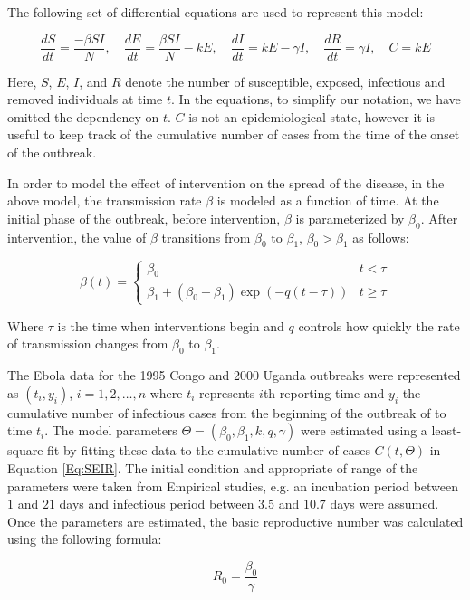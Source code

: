 \documentclass[10pt, journal,onecolumn]{IEEEtran}
\begin{document}
The following set of differential equations are used to represent this model:

$$
\dfrac{dS}{dt}	=	\dfrac{-\beta SI}{N}\nonumber,
\quad
\dfrac{dE}{dt}	=	\dfrac{\beta SI}{N}-kE\nonumber,
\quad
\dfrac{dI}{dt}	=	kE-\gamma I\nonumber,
\quad
\dfrac{dR}{dt}	=	\gamma I\nonumber,
\quad
             C	=	kE\nonumber
$$

Here, $S$, $E$, $I$, and $R$ denote the number of susceptible, exposed, infectious and removed
individuals at time $t$. In the equations, to simplify our notation, we have omitted the dependency
on $t$. $C$ is not an epidemiological state, however it is useful to keep track of the cumulative
number of cases from the time of the onset of the outbreak.

In order to model the effect of intervention on the spread of the disease, in the above model, the
transmission rate $\beta$ is modeled as a function of time. At the initial phase of the outbreak,
before intervention, $\beta$ is parameterized by $\beta_0$. After intervention, the value of
$\beta$ transitions from $\beta_0$ to $\beta_1$, $\beta_0>\beta_1$ as follows:

\[
\beta(t)=\begin{cases}
\beta_{0} & t<\tau\\
\beta_{1}+(\beta_{0}-\beta_{1})\exp\left(-q\left(t-\tau\right)\right) & t\ge\tau
\end{cases}
\]

Where $\tau$ is the time when interventions begin and $q$ controls how quickly the rate
of transmission changes from $\beta_0$ to $\beta_1$.

The Ebola data for the 1995 Congo and 2000 Uganda outbreaks were represented as $(t_i,y_i)$,
$i=1,2,\ldots,n$ where $t_i$ represents $i$th reporting time and $y_i$ the cumulative number of
infectious cases from the beginning of the outbreak of to time $t_i$.  The model parameters
$\Theta=(\beta_0,\beta_1,k,q,\gamma)$ were estimated using a least-square fit by fitting these data to
the cumulative number of cases $C(t,\Theta)$ in Equation \ref{Eq:SEIR}. The initial condition and
appropriate of range of the parameters were taken from Empirical studies, e.g. an incubation period
between $1$ and $21$ days and infectious period between $3.5$ and $10.7$ days were assumed. Once the
parameters are estimated, the basic reproductive number was calculated using the following formula:

\begin{equation}
R_0 = \dfrac{\beta_0}{\gamma}
\end{equation}
\end{document}
